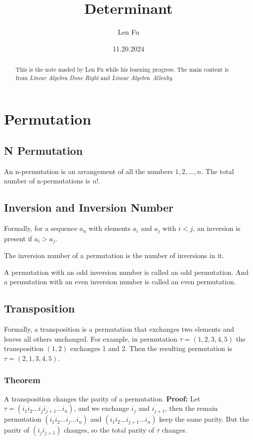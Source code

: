 \documentclass{article}
\title{Determinant}
\author{Len Fu}
\date{11.20.2024}
\theoremstyle{definition}
\begin{document}
\maketitle

\begin{abstract}
    This is the note maded by Len Fu while his learning progress.
    The main content is from \textit{Linear Algebra Done Right} and \textit{Linear Algebra\  Allenby}.
\end{abstract}

\tableofcontents
\newpage

\section{Permutation}

\subsection{N Permutation}
An n-permutation is an arrangement of all the numbers $1,2,...,n$.
The total number of n-permutations is $n!$.
\subsection{Inversion and Inversion Number}
Formally, for a sequence ${a_{n}}$ with elements 
$a_{i}$ and $a_{j}$ with $i<j$, an inversion is 
present if $a_{i}>a_{j}$.

The inversion number of a permutation is the number of inversions in it.

A permutation with an odd inversion number is called 
an odd permutation. And a permutation with an even inversion number 
is called an even permutation.

\subsection{Transposition}
Formally, a transposition is a permutation that 
exchanges two elements and leaves all others unchanged.
For example, in permutation $\tau=(1,2,3,4,5)$ the 
transposition $(1,2)$ exchanges 1 and 2.
Then the resulting permutation is $\tau=(2,1,3,4,5)$.

\subsubsection{Theorem}
A transposition changes the parity of a permutation.
\textbf{Proof:}\newline
Let $\tau = (i_{1}i_{2}...i_{j}i_{j+1}...i_{n})$, and 
we exchange $i_{j}$ and $i_{j+1}$, then the remain permutation 
$(i_{1}i_{2}...i_{j}...i_{n})$ and $(i_{1}i_{2}...i_{j+1}...i_{n})$ 
keep the same parity. But the paritr of $(i_{j}i_{j+1})$ changes,
so the total parity of $\tau$ changes.
\end{document}
